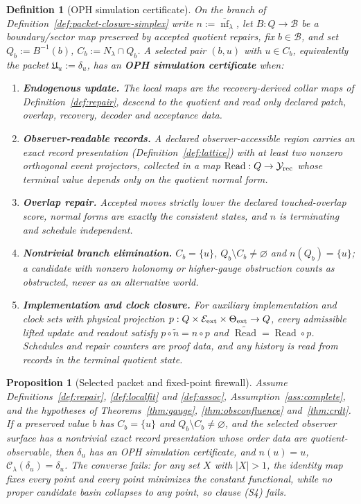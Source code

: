 \documentclass[11pt]{article}
\newtheorem{definition}[theorem]{Definition}
\newtheorem{proposition}[theorem]{Proposition}
\theoremstyle{remark}
\theoremstyle{plain}
\begin{document}
\begin{definition}[OPH simulation certificate]\label{def:oph-simulation}
On the branch of Definition~\ref{def:packet-closure-simplex} write
\(n:=\overline{\operatorname{nf}}_\lambda\), let \(B:Q\to\mathcal B\) be a
boundary/sector map preserved by accepted quotient repairs, fix
\(b\in\mathcal B\), and set \(Q_b:=B^{-1}(b)\), \(C_b:=N_\lambda\cap Q_b\).
A selected pair \((b,u)\) with \(u\in C_b\), equivalently the packet
\(\mathfrak U_u:=\delta_u\), has an \textbf{OPH simulation certificate} when:
\begin{enumerate}[label=(S\arabic*),leftmargin=3.0em]
\item \textbf{Endogenous update.} The local maps are the recovery-derived
collar maps of Definition~\ref{def:repair}, descend to the quotient and read
only declared patch, overlap, recovery, decoder and acceptance data.
\item \textbf{Observer-readable records.} A declared observer-accessible
region carries an exact record presentation (Definition~\ref{def:lattice})
with at least two nonzero orthogonal event projectors, collected in a map
\(\operatorname{Read}:Q\to\mathcal Y_{\rm rec}\) whose terminal value
depends only on the quotient normal form.
\item \textbf{Overlap repair.} Accepted moves strictly lower the declared
touched-overlap score, normal forms are exactly the consistent states, and
\(n\) is terminating and schedule independent.
\item \textbf{Nontrivial branch elimination.} \(C_b=\{u\}\),
\(Q_b\setminus C_b\ne\varnothing\) and \(n(Q_b)=\{u\}\); a candidate with
nonzero holonomy or higher-gauge obstruction counts as obstructed, never as
an alternative world.
\item \textbf{Implementation and clock closure.} For auxiliary
implementation and clock sets with physical projection
\(p:Q\times\mathcal E_{\rm ext}\times\Theta_{\rm ext}\to Q\), every
admissible lifted update and readout satisfy
\(p\circ\widetilde n=n\circ p\) and
\(\widetilde{\operatorname{Read}}=\operatorname{Read}\circ p\). Schedules
and repair counters are proof data, and any history is read from records in
the terminal quotient state.
\end{enumerate}
\end{definition}

\begin{proposition}[Selected packet and fixed-point firewall]\label{thm:oph-simulation}
Assume Definitions~\ref{def:repair}, \ref{def:localfit} and \ref{def:assoc},
Assumption~\ref{ass:complete}, and the hypotheses of
Theorems~\ref{thm:gauge}, \ref{thm:obsconfluence} and~\ref{thm:crdt}. If a
preserved value \(b\) has \(C_b=\{u\}\) and \(Q_b\setminus C_b\ne\varnothing\),
and the selected observer surface has a nontrivial exact record presentation
whose order data are quotient-observable, then \(\delta_u\) has an OPH
simulation certificate, and \(n(u)=u\),
\(\mathcal C_\lambda(\delta_u)=\delta_u\). The converse fails: for any set
\(X\) with \(|X|>1\), the identity map fixes every point and every point
minimizes the constant functional, while no proper candidate basin collapses
to any point, so clause (S4) fails.
\end{proposition}
\end{document}

